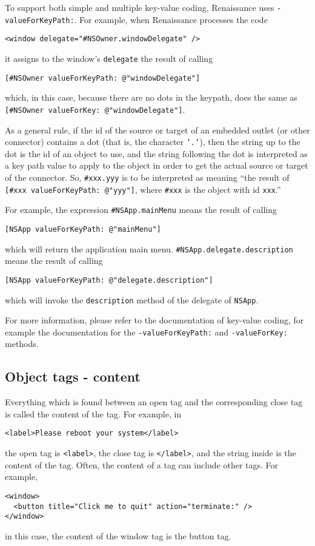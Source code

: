 To support both simple and multiple key-value coding, Renaissance uses
\texttt{-valueForKeyPath:}.  For example, when Renaissance processes the 
code
\begin{verbatim}
<window delegate="#NSOwner.windowDelegate" />
\end{verbatim}
it assigns to the window's \texttt{delegate} the result of calling
\begin{verbatim}
[#NSOwner valueForKeyPath: @"windowDelegate"]
\end{verbatim}
which, in this case, because there are no dots in the keypath, does
the same as \texttt{[\#NSOwner valueForKey: @"windowDelegate"]}.

As a general rule, if the id of the source or target of an embedded
outlet (or other connector) contains a dot (that is, the character
\texttt{'.'}), then the string up to the dot is the id of an object to
use, and the string following the dot is interpreted as a key path
value to apply to the object in order to get the actual source or
target of the connector.  So, \texttt{\#xxx.yyy} is to be interpreted
as meaning ``the result of \texttt{[\#xxx valueForKeyPath: @"yyy"]},
where \texttt{\#xxx} is the object with id \texttt{xxx}.''

For example, the expression \texttt{\#NSApp.mainMenu} means the result
of calling 
\begin{verbatim}
[NSApp valueForKeyPath: @"mainMenu"]
\end{verbatim}
which will return the application main menu.
\texttt{\#NSApp.delegate.description} means the result of calling
\begin{verbatim}
[NSApp valueForKeyPath: @"delegate.description"]
\end{verbatim}
which will invoke the \texttt{description} method of the delegate of
\texttt{NSApp}.

For more information, please refer to the documentation of key-value
coding, for example the documentation for the
\texttt{-valueForKeyPath:} and \texttt{-valueForKey:} methods.

\subsection{Object tags - content}
Everything which is found between an open tag and the corresponding
close tag is called the content of the tag.  For example, in
\begin{verbatim}
<label>Please reboot your system</label>
\end{verbatim}
the open tag is \texttt{<label>}, the close tag is \texttt{</label>},
and the string inside is the content of the tag.  Often, the content
of a tag can include other tags.  For example,
\begin{verbatim}
<window>
  <button title="Click me to quit" action="terminate:" />
</window>
\end{verbatim}
in this case, the content of the window tag is the button tag.

